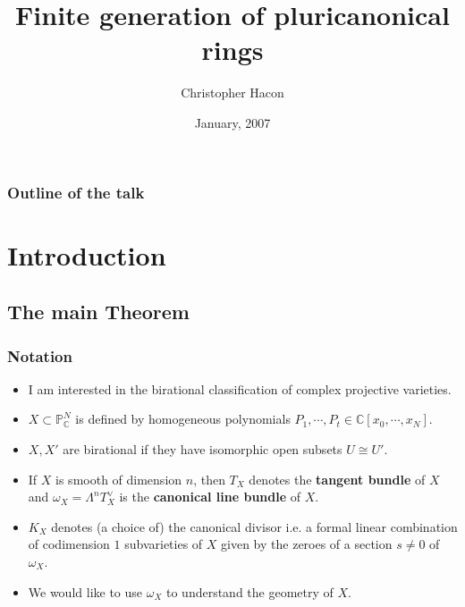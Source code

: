 \documentclass{beamer}
\title[Finite generation of pluricanonical rings]{Finite generation of pluricanonical rings}
\author{Christopher Hacon}
\institute{University of Utah}
\date{January, 2007}
\theoremstyle{plain}
\theoremstyle{definition}
\theoremstyle{remark}
\begin{document}
\begin{frame}
  \titlepage
\end{frame}



\begin{frame}
  \frametitle{Outline of the talk}
\end{frame}


\section{Introduction}


\subsection{The main Theorem}
\begin{frame}
  \frametitle{Notation}
\begin{itemize}
\item I am interested in the birational classification of complex projective
varieties.
\item $X\subset \mathbb{P}_{\mathbb{C}}^N$ is defined by homogeneous
polynomials $P_1,\cdots , P_t\in \mathbb{C}[x_0,\cdots ,x_N]$.
\item $X,X'$ are birational if they have isomorphic open subsets $U\cong U'$.
\item If $X$ is smooth of dimension $n$, then $T_X$ denotes the {\bf tangent bundle} of $X$ and $\omega _X=\Lambda ^nT_X^\vee$ is the {\bf canonical line bundle} of $X$.
\item $K_X$ denotes (a choice of) the canonical divisor i.e. a formal linear combination of codimension $1$ subvarieties of $X$ given by the zeroes of
a section $s\ne 0$ of $\omega _X$.
\item We would like to use $\omega _X$ to understand the geometry of $X$.
\end{itemize}

\end{frame}
\end{document}
